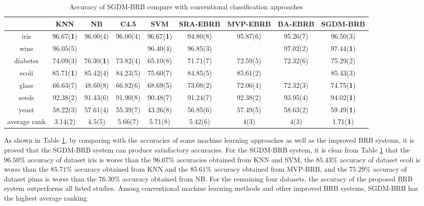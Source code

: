 \documentclass{ieeeaccess}
\begin{document}
\begin{table}
    \caption{Accuracy of SGDM-BRB compare with conventional classification approaches}
    \centering
    \normalsize
    \label{tab5}
    \begin{tabular}{|c|c|c|c|c|c|c|c|c|}
        \hline
                     & KNN               & NB                & C4.5     & SVM               & SRA-EBRB & MVP-EBRB & BA-EBRB  & SGDM-BRB          \\
        \hline
        iris         & 96.67(\textbf{1}) & 96.00(4)          & 96.00(4) & 96.67(\textbf{1}) & 94.80(8) & 95.87(6) & 95.26(7) & 96.50(3)          \\
        wine         & 96.05(5)          &                   &          & 96.40(4)          & 96.85(3) &          & 97.02(2) & 97.44(\textbf{1}) \\
        diabetes     & 74.09(3)          & 76.30(\textbf{1}) & 73.82(4) & 65.10(8)          & 71.71(7) & 72.59(5) & 72.32(6) & 75.29(2)          \\
        ecoli        & 85.71(\textbf{1}) & 85.42(4)          & 84.23(5) & 75.60(7)          & 84.85(5) & 85.61(2) &          & 85.43(3)          \\
        glass        & 66.63(7)          & 48.60(8)          & 66.82(6) & 68.69(5)          & 73.08(2) & 72.06(4) & 72.32(3) & 74.75(\textbf{1}) \\
        seeds        & 92.38(2)          & 91.43(6)          & 91.90(8) & 90.48(7)          & 91.24(7) & 92.38(2) & 93.95(4) & 94.02(\textbf{1}) \\
        yeast        & 58.22(3)          & 57.61(4)          & 55.39(7) & 43.26(8)          & 56.85(6) & 57.49(5) & 58.63(2) & 59.49(\textbf{1}) \\
        \hline
        average rank & 3.14(2)           & 4.5(5)            & 5.66(7)  & 5.71(8)           & 5.42(6)  & 4(3)     & 4(3)     & 1.71(\textbf{1})  \\
        \hline
    \end{tabular}
\end{table}

As shown in Table \ref{tab5}, by comparing with the accuracies of some machine learning approaches as well as the improved BRB systems, it is proved that the SGDM-BRB system can produce satisfactory accuracies.
For the SGDM-BRB system, it is clear from Table \ref{tab5} that
the $96.50\%$ accuracy of dataset iris is worse than the $96.67\%$ accuracies obtained from KNN and SVM,
the $85.43\%$ accuracy of dataset ecoli is worse than the $85.71\%$ accuracy obtained from KNN and the $85.61\%$ accuracy obtained from MVP-BRB,
and the $75.29\%$ accuracy of dataset pima is worse than the $76.30\%$ accuracy obtained from NB.
For the remaining four datasets, the accuracy of the proposed BRB system outperforms all listed studies.
Among conventional machine learning methods and other improved BRB systems, SGDM-BRB has the highest average ranking.
\end{document}
